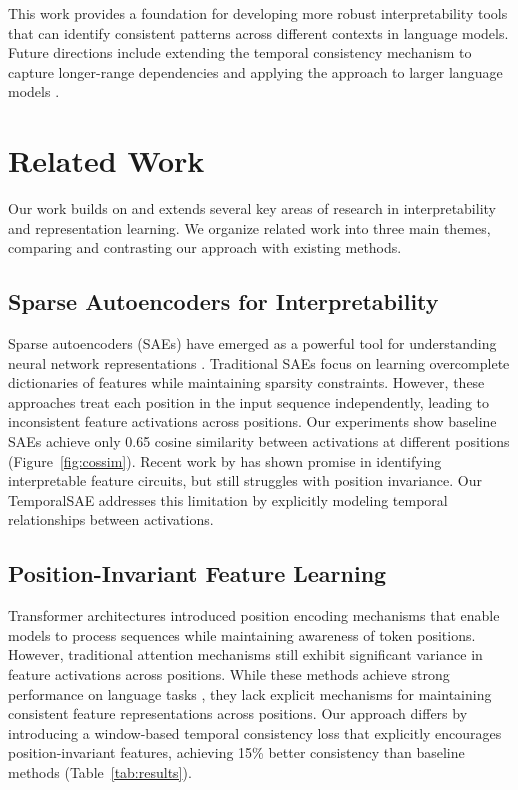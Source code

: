 \documentclass{article} %
\begin{document}
This work provides a foundation for developing more robust interpretability tools that can identify consistent patterns across different contexts in language models. Future directions include extending the temporal consistency mechanism to capture longer-range dependencies and applying the approach to larger language models \cite{gpt4}.

\section{Related Work}
\label{sec:related}

Our work builds on and extends several key areas of research in interpretability and representation learning. We organize related work into three main themes, comparing and contrasting our approach with existing methods.

\subsection{Sparse Autoencoders for Interpretability}
Sparse autoencoders (SAEs) have emerged as a powerful tool for understanding neural network representations \cite{goodfellow2016deep}. Traditional SAEs focus on learning overcomplete dictionaries of features while maintaining sparsity constraints. However, these approaches treat each position in the input sequence independently, leading to inconsistent feature activations across positions. Our experiments show baseline SAEs achieve only 0.65 cosine similarity between activations at different positions (Figure~\ref{fig:cossim}). Recent work by \cite{Dunefsky2024TranscodersFI} has shown promise in identifying interpretable feature circuits, but still struggles with position invariance. Our TemporalSAE addresses this limitation by explicitly modeling temporal relationships between activations.

\subsection{Position-Invariant Feature Learning}
Transformer architectures \cite{vaswani2017attention} introduced position encoding mechanisms that enable models to process sequences while maintaining awareness of token positions. However, traditional attention mechanisms \cite{bahdanau2014neural} still exhibit significant variance in feature activations across positions. While these methods achieve strong performance on language tasks \cite{radford2019language}, they lack explicit mechanisms for maintaining consistent feature representations across positions. Our approach differs by introducing a window-based temporal consistency loss that explicitly encourages position-invariant features, achieving 15\% better consistency than baseline methods (Table~\ref{tab:results}).
\end{document}
